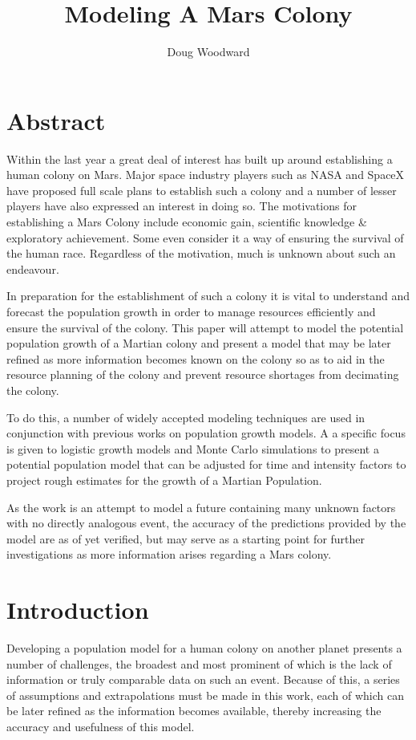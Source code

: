 \documentclass[12pt]{article}
\title{\textbf{Modeling A Mars Colony}}
\author{Doug Woodward\\}
\date{}
\begin{document}
\maketitle


\section{Abstract}


Within the last year a  great deal of interest has built up around establishing a human colony on Mars. Major space industry players such as NASA\cite{nasa} and SpaceX\cite{spacex} have proposed full scale plans to establish such a colony and a number of lesser players have also expressed an interest in doing so. The motivations for establishing a Mars Colony include economic gain, scientific knowledge \& exploratory achievement\cite{nasa}. Some even consider it a way of ensuring the survival of the human race\cite{spacex}. Regardless of the motivation, much is unknown about such an endeavour. 


In preparation for the establishment of such a colony it is vital to understand and forecast the population growth in order to manage resources efficiently and ensure the survival of the colony. This paper will attempt to model the potential population growth of a Martian colony and present a model that may be later refined as more information becomes known on the colony so as to aid in the resource planning of the colony and prevent resource shortages from decimating the colony. 


To do this, a number of widely accepted modeling techniques are used in conjunction with previous works on population growth models. A a specific focus is given to logistic growth models and Monte Carlo simulations to present a potential population model that can be adjusted for time and intensity factors to project rough estimates for the growth of a Martian Population.


As the work is an attempt to model a future containing many unknown factors with no directly analogous event, the accuracy of the predictions provided by the model are as of yet verified, but may serve as a starting point for further investigations as more information arises regarding a Mars colony.
\\




\section{Introduction}
Developing a population model for a human colony on another planet presents a number of challenges, the broadest and most prominent of which is the lack of information or truly comparable data on such an event. Because of this, a series of assumptions and extrapolations must be made in this work, each of which can be later refined as the information becomes available, thereby increasing the accuracy and usefulness of this model. 
\end{document}
